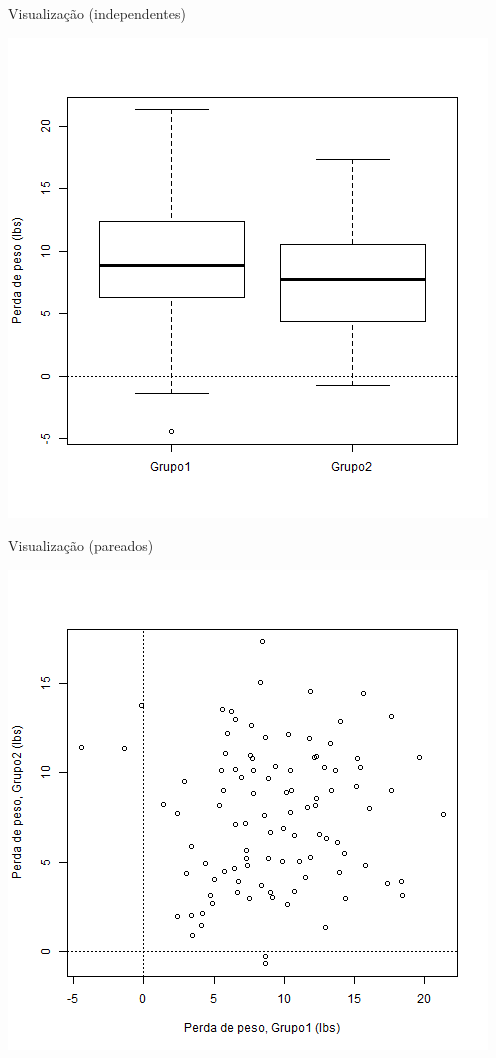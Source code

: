 \documentclass{beamer}
\begin{document}
\begin{frame}{Visualização (independentes)}
  \begin{center}
    \includegraphics[height=\textheight]{Cap23-25/obesidade-independentes}
  \end{center}
\end{frame}

\begin{frame}{Visualização (pareados)}
  \begin{center}
    \includegraphics[height=\textheight]{Cap23-25/obesidade-pareadas}
  \end{center}
\end{frame}
\end{document}

